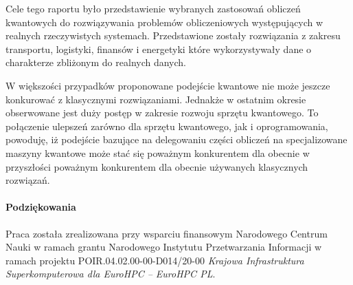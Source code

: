 \documentclass[a4paper,11pt]{article}
\begin{document}
Cele tego raportu było przedstawienie wybranych zastosowań obliczeń kwantowych do rozwiązywania problemów obliczeniowych występujących w realnych rzeczywistych systemach. Przedstawione zostały rozwiązania z zakresu transportu, logistyki, finansów i energetyki które wykorzystywały dane o charakterze zbliżonym do realnych danych.


W większości przypadków proponowane podejście kwantowe nie może jeszcze konkurować z klasycznymi rozwiązaniami. Jednakże w ostatnim okresie obserwowane jest duży postęp w zakresie rozwoju sprzętu kwantowego. To połączenie ulepszeń zarówno dla sprzętu kwantowego, jak i oprogramowania, powoduję, iż podejście bazujące na delegowaniu części obliczeń na specjalizowane maszyny kwantowe może stać się poważnym konkurentem dla obecnie w przyszłości poważnym konkurentem dla obecnie używanych klasycznych rozwiązań.

\paragraph{Podziękowania}
Praca została zrealizowana przy wsparciu finansowym Narodowego Centrum Nauki w ramach grantu Narodowego Instytutu Przetwarzania Informacji w ramach projektu POIR.04.02.00-00-D014/20-00 \emph{Krajowa Infrastruktura Superkomputerowa dla EuroHPC -- EuroHPC PL}.



\end{document}
